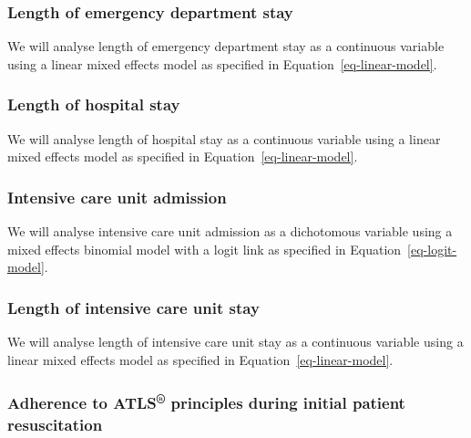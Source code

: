 \documentclass[
]{scrartcl}
\begin{document}
\hypertarget{length-of-emergency-department-stay}{%
\subsubsection{Length of emergency department
stay}\label{length-of-emergency-department-stay}}

We will analyse length of emergency department stay as a continuous
variable using a linear mixed effects model as specified in
Equation~\ref{eq-linear-model}.

\hypertarget{length-of-hospital-stay}{%
\subsubsection{Length of hospital stay}\label{length-of-hospital-stay}}

We will analyse length of hospital stay as a continuous variable using a
linear mixed effects model as specified in
Equation~\ref{eq-linear-model}.

\hypertarget{intensive-care-unit-admission}{%
\subsubsection{Intensive care unit
admission}\label{intensive-care-unit-admission}}

We will analyse intensive care unit admission as a dichotomous variable
using a mixed effects binomial model with a logit link as specified in
Equation~\ref{eq-logit-model}.

\hypertarget{length-of-intensive-care-unit-stay}{%
\subsubsection{Length of intensive care unit
stay}\label{length-of-intensive-care-unit-stay}}

We will analyse length of intensive care unit stay as a continuous
variable using a linear mixed effects model as specified in
Equation~\ref{eq-linear-model}.

\hypertarget{adherence-to-atls-principles-during-initial-patient-resuscitation}{%
\subsubsection{\texorpdfstring{Adherence to ATLS\textsuperscript{®}
principles during initial patient
resuscitation}{Adherence to ATLS® principles during initial patient resuscitation}}\label{adherence-to-atls-principles-during-initial-patient-resuscitation}}
\end{document}
